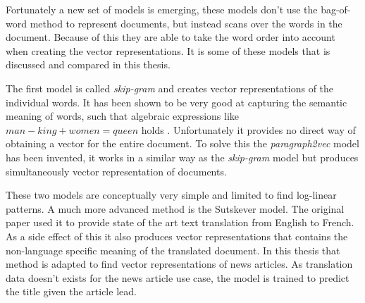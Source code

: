 Fortunately a new set of models is emerging, these models don't use the bag-of-word method to represent documents, but instead scans over the words in the document. Because of this they are able to take the word order into account when creating the vector representations. It is some of these models that is discussed and compared in this thesis.

The first model is called \textit{skip-gram} and creates vector representations of the individual words. It has been shown to be very good at capturing the semantic meaning of words, such that algebraic expressions like $man - king + women = queen$ holds \cite{word2vec-comparing, word2vec-details}. Unfortunately it provides no direct way of obtaining a vector for the entire document. To solve this the \textit{paragraph2vec} model has been invented, it works in a similar way as the \textit{skip-gram} model but produces simultaneously vector representation of documents.

These two models are conceptually very simple and limited to find log-linear patterns. A much more advanced method is the Sutskever model. The original paper \cite{sutskever} used it to provide state of the art text translation from English to French. As a side effect of this it also produces vector representations that contains the non-language specific meaning of the translated document. In this thesis that method is adapted to find vector representations of news articles. As translation data doesn't exists for the news article use case, the model is trained to predict the title given the article lead.
